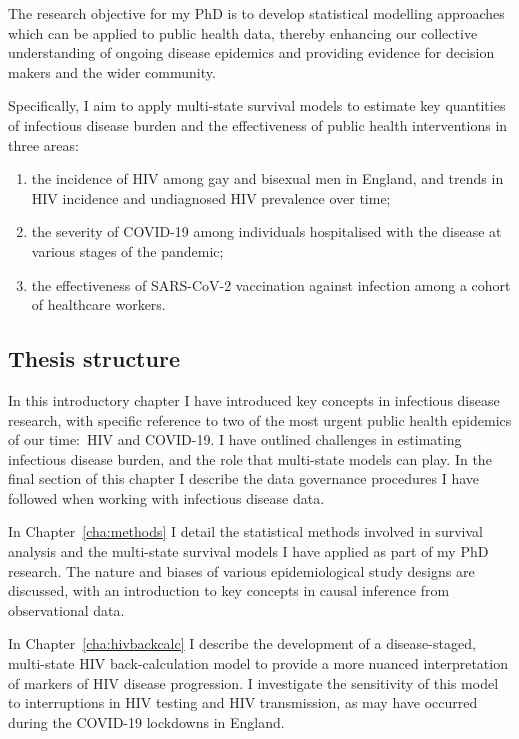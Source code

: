 The research objective for my PhD is to develop statistical modelling approaches which can be applied to public health data, thereby enhancing our collective understanding of ongoing disease epidemics and providing evidence for decision makers and the wider community.

Specifically, I aim to apply multi-state survival models to estimate key quantities of infectious disease burden and the effectiveness of public health interventions in three areas:
%
\begin{enumerate}
  \item the incidence of HIV among gay and bisexual men in England, and trends in HIV incidence and undiagnosed HIV prevalence over time;
  \item the severity of COVID-19 among individuals hospitalised with the disease at various stages of the pandemic;
  \item the effectiveness of SARS-CoV-2 vaccination against infection among a cohort of healthcare workers.
\end{enumerate}

\subsection{Thesis structure}

In this introductory chapter I have introduced key concepts in infectious disease research, with specific reference to two of the most urgent public health epidemics of our time:\ HIV and COVID-19. I have outlined challenges in estimating infectious disease burden, and the role that multi-state models can play. In the final section of this chapter I describe the data governance procedures I have followed when working with infectious disease data.

In Chapter~\ref{cha:methods} I detail the statistical methods involved in survival analysis and the multi-state survival models I have applied as part of my PhD research. The nature and biases of various epidemiological study designs are discussed, with an introduction to key concepts in causal inference from observational data.

In Chapter~\ref{cha:hivbackcalc} I describe the development of a disease-staged, multi-state HIV back-calculation model to provide a more nuanced interpretation of markers of HIV disease progression. I investigate the sensitivity of this model to interruptions in HIV testing and HIV transmission, as may have occurred during the COVID-19 lockdowns in England.

